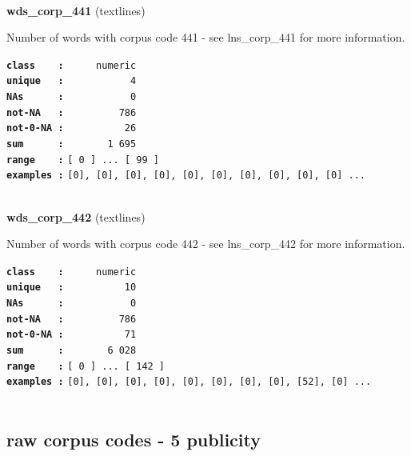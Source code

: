 \documentclass[]{article}
\begin{document}
~

\textbf{wds\_corp\_441} (textlines)

Number of words with corpus code 441 - see lns\_corp\_441 for more
information.

\textbf{\texttt{class\ \ \ \ :}} \texttt{~~~~~numeric}\\
\textbf{\texttt{unique\ \ \ :}} \texttt{~~~~~~~~~~~4}\\
\textbf{\texttt{NAs\ \ \ \ \ \ :}} \texttt{~~~~~~~~~~~0}\\
\textbf{\texttt{not-NA\ \ \ :}} \texttt{~~~~~~~~~786}\\
\textbf{\texttt{not-0-NA\ :}} \texttt{~~~~~~~~~~26}\\
\textbf{\texttt{sum\ \ \ \ \ \ :}} \texttt{~~~~~~~1~695}\\
\textbf{\texttt{range\ \ \ \ :}}
\texttt{{[}\ 0\ {]}\ ...\ {[}\ 99\ {]}}\\
\textbf{\texttt{examples\ :}}
\texttt{{[}0{]},\ {[}0{]},\ {[}0{]},\ {[}0{]},\ {[}0{]},\ {[}0{]},\ {[}0{]},\ {[}0{]},\ {[}0{]},\ {[}0{]}\ ...}\\

~

\textbf{wds\_corp\_442} (textlines)

Number of words with corpus code 442 - see lns\_corp\_442 for more
information.

\textbf{\texttt{class\ \ \ \ :}} \texttt{~~~~~numeric}\\
\textbf{\texttt{unique\ \ \ :}} \texttt{~~~~~~~~~~10}\\
\textbf{\texttt{NAs\ \ \ \ \ \ :}} \texttt{~~~~~~~~~~~0}\\
\textbf{\texttt{not-NA\ \ \ :}} \texttt{~~~~~~~~~786}\\
\textbf{\texttt{not-0-NA\ :}} \texttt{~~~~~~~~~~71}\\
\textbf{\texttt{sum\ \ \ \ \ \ :}} \texttt{~~~~~~~6~028}\\
\textbf{\texttt{range\ \ \ \ :}}
\texttt{{[}\ 0\ {]}\ ...\ {[}\ 142\ {]}}\\
\textbf{\texttt{examples\ :}}
\texttt{{[}0{]},\ {[}0{]},\ {[}0{]},\ {[}0{]},\ {[}0{]},\ {[}0{]},\ {[}0{]},\ {[}0{]},\ {[}52{]},\ {[}0{]}\ ...}\\

~

\subsection{raw corpus codes - 5
publicity}\label{raw-corpus-codes---5-publicity}
\end{document}
